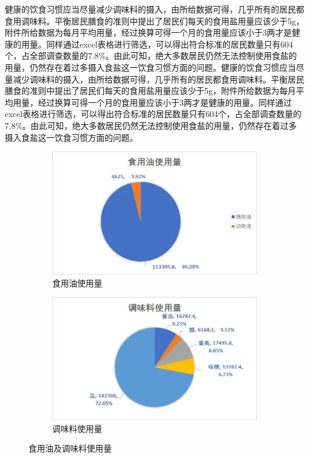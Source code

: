 \documentclass{cumcmthesis}
\begin{document}
 健康的饮食习惯应当尽量减少调味料的摄入，由所给数据可得，几乎所有的居民都食用调味料。平衡居民膳食的准则中提出了居民们每天的食用盐用量应该少于5g，附件所给数据为每月平均用量，经过换算可得一个月的食用量应该小于3两才是健康的用量。同样通过excel表格进行筛选，可以得出符合标准的居民数量只有604个，占全部调查数量的7.8\%。由此可知，绝大多数居民仍然无法控制使用食盐的用量，仍然存在着过多摄入食盐这一饮食习惯方面的问题。健康的饮食习惯应当尽量减少调味料的摄入，由所给数据可得，几乎所有的居民都食用调味料。平衡居民膳食的准则中提出了居民们每天的食用盐用量应该少于5g，附件所给数据为每月平均用量，经过换算可得一个月的食用量应该小于3两才是健康的用量。同样通过excel表格进行筛选，可以得出符合标准的居民数量只有604个，占全部调查数量的7.8\%。由此可知，绝大多数居民仍然无法控制使用食盐的用量，仍然存在着过多摄入食盐这一饮食习惯方面的问题。
\begin{figure}[H]
  \centering

  \begin{subfigure}[b]{0.45\textwidth}
    \includegraphics[width=\textwidth]{figures/QQ图片20230813183040.jpg}
    \caption{食用油使用量}
    \label{t11}
  \end{subfigure}
  \hfill
  \begin{subfigure}[b]{0.45\textwidth}
    \includegraphics[width=\textwidth]{figures/QQ图片20230813170545.jpg}
    \caption{调味料使用量}
    \label{t12}
  \end{subfigure}
  \caption{食用油及调味料使用量}
\end{figure}
\end{document}
